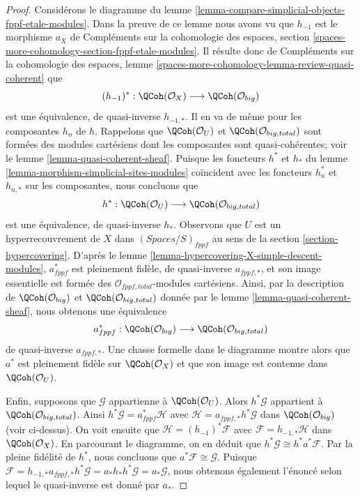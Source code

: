 \begin{proof}
Considérons le diagramme du lemme
\ref{lemma-compare-simplicial-objects-fppf-etale-modules}.
Dans la preuve de ce lemme nous avons vu que
$h_{-1}$ est le morphisme $a_X$ de
Compléments sur la cohomologie des espaces, section
\ref{spaces-more-cohomology-section-fppf-etale-modules}.
Il résulte donc de
Compléments sur la cohomologie des espaces, lemme
\ref{spaces-more-cohomology-lemma-review-quasi-coherent}
que
$$
(h_{-1})^* :
\QCoh(\mathcal{O}_X)
\longrightarrow
\QCoh(\mathcal{O}_{big})
$$
est une équivalence, de quasi-inverse $h_{-1, *}$.
Il en va de même pour les composantes $h_n$ de $h$.
Rappelons que $\QCoh(\mathcal{O}_U)$ et $\QCoh(\mathcal{O}_{big, total})$
sont formées des modules cartésiens dont les composantes sont quasi-cohérentes; voir le
lemme \ref{lemma-quasi-coherent-sheaf}.
Puisque les foncteurs $h^*$ et $h_*$ du
lemme \ref{lemma-morphism-simplicial-sites-modules}
coïncident avec les foncteurs $h_n^*$ et $h_{n, *}$ sur les composantes,
nous concluons que
$$
h^* :
\QCoh(\mathcal{O}_U)
\longrightarrow 
\QCoh(\mathcal{O}_{big, total})
$$
est une équivalence, de quasi-inverse $h_*$.
Observons que $U$ est un hyperrecouvrement de $X$ dans $(\textit{Spaces}/S)_{fppf}$
au sens de la section \ref{section-hypercovering}.
D'après le lemme \ref{lemma-hypercovering-X-simple-descent-modules},
$a_{fppf}^*$ est pleinement fidèle, de quasi-inverse
$a_{fppf, *}$, et son image essentielle est formée des
$\mathcal{O}_{fppf, total}$-modules cartésiens.
Ainsi, par la description de $\QCoh(\mathcal{O}_{big})$ et
$\QCoh(\mathcal{O}_{big, total})$ donnée par le lemme \ref{lemma-quasi-coherent-sheaf},
nous obtenons une équivalence
$$
a_{fppf}^* :
\QCoh(\mathcal{O}_{big})
\longrightarrow
\QCoh(\mathcal{O}_{big, total})
$$
de quasi-inverse $a_{fppf, *}$.
Une chasse formelle dans le diagramme montre alors que
$a^*$ est pleinement fidèle sur $\QCoh(\mathcal{O}_X)$ et que son image est
contenue dans $\QCoh(\mathcal{O}_U)$.

\medskip\noindent
Enfin, supposons que $\mathcal{G}$ appartienne à $\QCoh(\mathcal{O}_U)$.
Alors $h^*\mathcal{G}$ appartient à $\QCoh(\mathcal{O}_{big, total})$.
Ainsi $h^*\mathcal{G} = a_{fppf}^*\mathcal{H}$ avec
$\mathcal{H} = a_{fppf, *}h^*\mathcal{G}$
dans $\QCoh(\mathcal{O}_{big})$ (voir ci-dessus).
On voit ensuite que $\mathcal{H} = (h_{-1})^*\mathcal{F}$
avec $\mathcal{F} = h_{-1, *}\mathcal{H}$ dans $\QCoh(\mathcal{O}_X)$.
En parcourant le diagramme, on en déduit que
$h^*\mathcal{G} \cong h^*a^*\mathcal{F}$.
Par la pleine fidélité de $h^*$, nous concluons que
$a^*\mathcal{F} \cong \mathcal{G}$.
Puisque $\mathcal{F} = h_{-1, *}a_{fppf, *}h^*\mathcal{G} =
a_*h_*h^*\mathcal{G} = a_*\mathcal{G}$, nous obtenons également
l'énoncé selon lequel le quasi-inverse est donné par $a_*$.
\end{proof}

